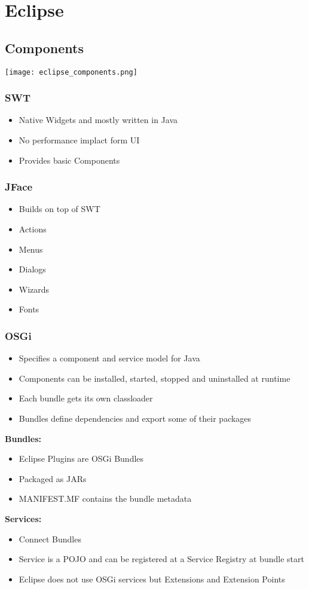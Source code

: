 \section{Eclipse}
\subsection{Components}
\texttt{[image: eclipse\_components.png]}
\subsubsection{SWT}
\begin{itemize}
    \item Native Widgets and mostly written in Java
    \item No performance implact form UI
    \item Provides basic Components
\end{itemize}
\subsubsection{JFace}
\begin{itemize}
    \item Builds on top of SWT
    \item Actions
    \item Menus
    \item Dialogs
    \item Wizards
    \item Fonts
\end{itemize}
\subsubsection{OSGi}
\begin{itemize}
    \item Specifies a component and service model for Java
    \item Components can be installed, started, stopped and uninstalled at runtime
    \item Each bundle gets its own classloader
    \item Bundles define dependencies and export some of their packages
\end{itemize}
\textbf{Bundles:}
\begin{itemize}
    \item Eclipse Plugins are OSGi Bundles
    \item Packaged as JARs
    \item MANIFEST.MF contains the bundle metadata
\end{itemize}
\textbf{Services:}
\begin{itemize}
    \item Connect Bundles
    \item Service is a POJO and can be registered at a Service Registry at bundle start
    \item Eclipse does not use OSGi services but Extensions and Extension Points
\end{itemize}

